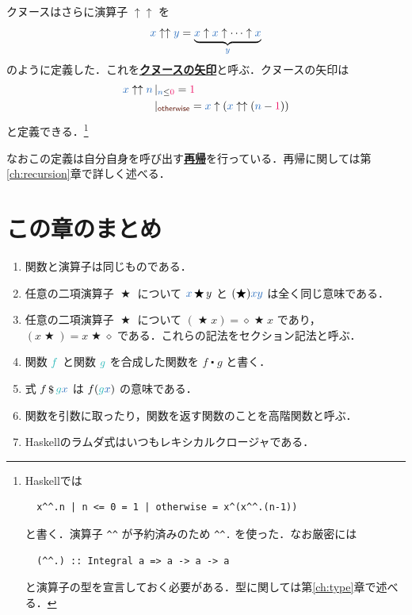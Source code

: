 \documentclass[a5paper,twoside,fleqn,draft]{jsbook}
\def\constantColor{WildStrawberry}
\def\keywordColor{Sepia}
\def\varColor{NavyBlue}
\def\funcColor{BlueGreen}
\newcommand{\programminglanguage}[1]{\textsf{#1}}
\newcommand{\haskell}{\programminglanguage{Haskell}}
\newcommand{\keyword}[1]{{\underline{\textbf{#1}}}}
\newcommand{\code}[1]{\texttt{#1}}
\newcommand{\mKeyword}[1]{\textcolor{\keywordColor}{\mathsf{#1}}}
\newcommand{\mOtherwiseKeyword}{\mKeyword{otherwise}}
\DeclareMathOperator{\mOtherwise}{\mOtherwiseKeyword}
\newcommand{\mConstant}[1]{\textcolor{\constantColor}{#1}}
\newcommand{\mZeroNumber}{{\mConstant{0}}}
\newcommand{\mOneNumber}{{\mConstant{1}}}
\newcommand{\mVar}[1]{\textcolor{\varColor}{#1}}
\newcommand{\mAnonParam}{\diamond}
\newcommand{\mNVar}{\mVar{n}}
\newcommand{\mXVar}{\mVar{x}}
\newcommand{\mYVar}{\mVar{y}}
\newcommand{\mFunc}[1]{\textcolor{\funcColor}{#1}}
\newcommand{\mFFunc}{{\mFunc{f}}}
\newcommand{\mGFunc}{\mFunc{g}}
\DeclareMathOperator{\mApply}{\$}
\DeclareMathOperator{\mBinOp}{\bigstar}
\DeclareMathOperator{\mCompFunc}{\centerdot}
\newcommand{\mGuard}[1]{\mathop{\mid_{#1}}}
\begin{document}
クヌースはさらに演算子 $\uparrow\uparrow$ を
\begin{equation}
  \mXVar\uparrow\uparrow\mYVar
  =\underbrace{\mXVar\uparrow\mXVar\uparrow\dotsb\uparrow\mXVar}_{\mYVar}
\end{equation}
のように定義した．これを\keyword{クヌースの矢印}と呼ぶ．クヌースの矢印は
\begin{align}
  \mXVar\uparrow\uparrow\mNVar
  &\mGuard{\mNVar\le\mZeroNumber}=\mOneNumber\\
  &\mGuard{\mOtherwise}
  =\mXVar\uparrow(\mXVar\uparrow\uparrow(\mNVar-\mOneNumber))
\end{align}
と定義できる．\footnote{\haskell では
\begin{verbatim}
  x^^.n | n <= 0 = 1 | otherwise = x^(x^^.(n-1))
\end{verbatim}
と書く．演算子 \code{\textasciicircum\textasciicircum} が予約済みのため \code{\textasciicircum\textasciicircum.} を使った．なお厳密には
\begin{verbatim}
  (^^.) :: Integral a => a -> a -> a
\end{verbatim}
と演算子の型を宣言しておく必要がある．型に関しては第\ref{ch:type}章で述べる．}

なおこの定義は自分自身を呼び出す\keyword{再帰}を行っている．再帰に関しては第\ref{ch:recursion}章で詳しく述べる．

\section{この章のまとめ}

\begin{enumerate}
\item 関数と演算子は同じものである．
\item 任意の二項演算子 $\mBinOp$ について $\mXVar\mBinOp y$ と $(\mBinOp)\mXVar\mYVar$ は全く同じ意味である．
\item 任意の二項演算子 $\mBinOp$ について $(\mBinOp x)=\mAnonParam\mBinOp x$ であり，$(x\mBinOp)=x\mBinOp\mAnonParam$ である．これらの記法をセクション記法と呼ぶ．
\item 関数 $\mFFunc$ と関数 $\mGFunc$ を合成した関数を $f\mCompFunc g$ と書く．
\item 式 $f\mApply \mGFunc\mXVar$ は $f(\mGFunc\mXVar)$ の意味である．
\item 関数を引数に取ったり，関数を返す関数のことを高階関数と呼ぶ．
\item \haskell のラムダ式はいつもレキシカルクロージャである．
\end{enumerate}
\end{document}
